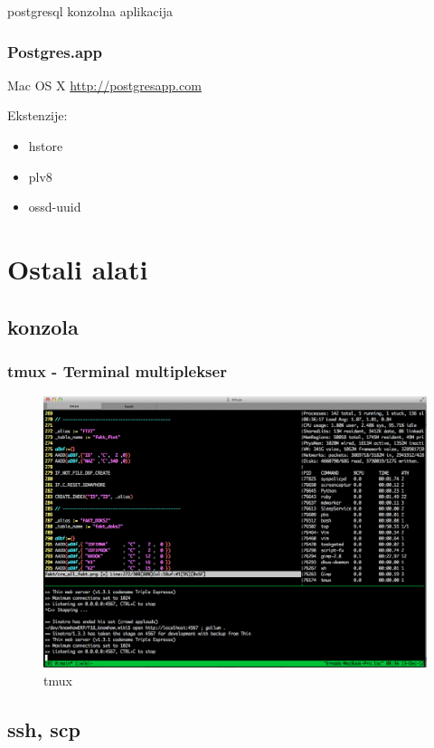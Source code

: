 \documentclass[times, utf8, seminar]{fit}
\begin{document}
postgresql konzolna aplikacija

\subsection{Postgres.app}

Mac OS X \url{http://postgresapp.com}

Ekstenzije:
\begin{itemize}
  \item hstore
  \item plv8
  \item ossd-uuid  
\end{itemize}

\chapter{Ostali alati}

\section{konzola}

\subsection{tmux - Terminal multiplekser }

\begin{figure}[H]
\centering
\includegraphics[width=14cm]{img/tmux.png}
\caption{tmux}
\end{figure}


\section{ssh, scp}
\end{document}
